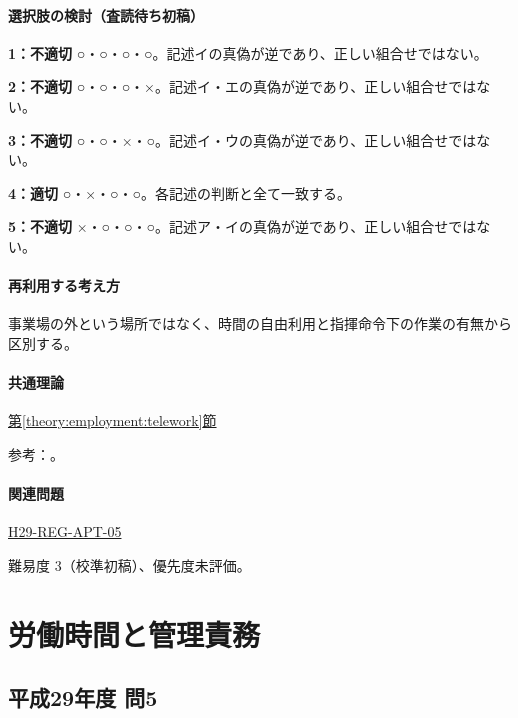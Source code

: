 \paragraph{選択肢の検討（査読待ち初稿）}\mbox{}\par

\noindent\textbf{1：不適切} ○・○・○・○。記述イの真偽が逆であり、正しい組合せではない。\par

\noindent\textbf{2：不適切} ○・○・○・×。記述イ・エの真偽が逆であり、正しい組合せではない。\par

\noindent\textbf{3：不適切} ○・○・×・○。記述イ・ウの真偽が逆であり、正しい組合せではない。\par

\noindent\textbf{4：適切} ○・×・○・○。各記述の判断と全て一致する。\par

\noindent\textbf{5：不適切} ×・○・○・○。記述ア・イの真偽が逆であり、正しい組合せではない。\par

\paragraph{再利用する考え方} 事業場の外という場所ではなく、時間の自由利用と指揮命令下の作業の有無から区別する。

\paragraph{共通理論} \hyperref[theory:employment:telework]{第\ref*{theory:employment:telework}節}

\par 参考：\cite{employment_telework2020,employment_telework_current}。

\paragraph{関連問題} \hyperref[q:h29-reg-apt-05]{H29-REG-APT-05}

\par 難易度 3（校準初稿）、優先度未評価。

\section{労働時間と管理責務}

\subsection{平成29年度 問5}
\label{q:h29-reg-apt-05}

